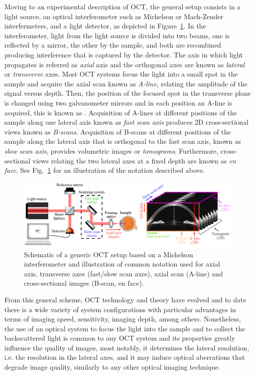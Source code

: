 Moving to an experimental description of OCT, the general setup consists in a light source, an optical interferometer such as Michelson or Mach-Zender interfermeters, and a light detector, as depicted in Figure~\ref{fig:OCT_ScanningScheme}. In the interferometer, light from the light source is divided into two beams, one is reflected by a mirror, the other by the sample, and both are recombined producing interference that is captured by the detector. The axis in which light propagates is referred as \textit{axial} axis and the orthogonal axes are known as \textit{lateral} or \textit{transverse} axes. Most OCT systems focus the light into a small spot in the sample and acquire the axial scan known as \textit{A-line}, relating the amplitude of the signal versus depth. Then, the position of the focused spot in the transverse plane is changed using two galvanometer mirrors and in each position an A-line is acquired, this is known as . Acquisition of A-lines at different positions of the sample along one lateral axis known as \textit{fast scan axis} produces 2D cross-sectional views known as \textit{B-scans}. Acquisition of B-scans at different positions of the sample along the lateral axis that is orthogonal to the fast scan axis, known as \textit{slow scan axis}, provides volumetric images or \textit{tomograms}. Furthermore, cross-sectional views relating the two lateral axes at a fixed depth are known as \textit{en face}. See Fig.~\ref{fig:OCT_ScanningScheme} for an illustration of the notation described above.

\begin{figure}
    \centering
    \includegraphics[width=\textwidth]{Figures/Introduction/OCT_ScanningSchemes.pdf}
    \caption{Schematic of a generic OCT setup based on a Michelson interferometer and illustration of common notation used for axial axis, transverse axes (fast/slow scan axes), axial scan (A-line) and cross-sectional images (B-scan, en face).}
    \label{fig:OCT_ScanningScheme}
\end{figure}

From this general scheme, OCT technology and theory have evolved and to date there is a wide variety of system configurations with particular advantages in terms of imaging speed, sensitivity, imaging depth, among others. Nonetheless, the use of an optical system to focus the light into the sample and to collect the backscattered light is common to any OCT system and its properties greatly influence the quality of images, most notably, it determines the lateral resolution, i.e. the resolution in the lateral axes, and it may induce optical aberrations that degrade image quality, similarly to any other optical imaging technique.

